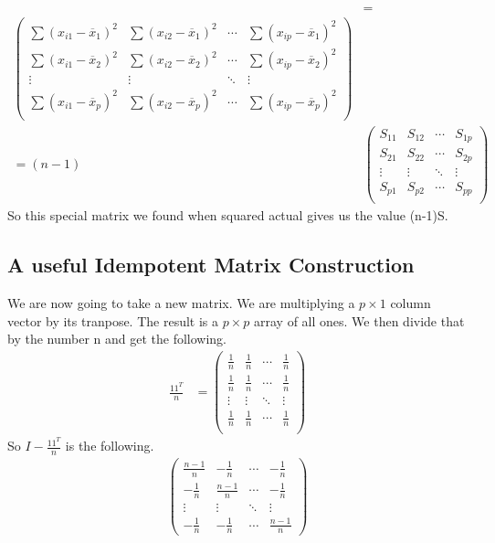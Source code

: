 \begin{align*}
    &=\\
    \begin{pmatrix}
        \displaystyle\sum(x_{i1}-\overline{x}_1)^2 & \displaystyle\sum(x_{i2}-\overline{x}_1)^2 & \cdots & \displaystyle\sum(x_{ip}-\overline{x}_1)^2 \\
        \displaystyle\sum(x_{i1}-\overline{x}_2)^2 & \displaystyle\sum(x_{i2}-\overline{x}_2)^2 & \cdots & \displaystyle\sum(x_{ip}-\overline{x}_2)^2 \\
        \vdots & \vdots & \ddots & \vdots \\
        \displaystyle\sum(x_{i1}-\overline{x}_p)^2 & \displaystyle\sum(x_{i2}-\overline{x}_p)^2 & \cdots & \displaystyle\sum(x_{ip}-\overline{x}_p)^2 \\
    \end{pmatrix}\\
    = (n-1)&
    \begin{pmatrix}
        S_{11} & S_{12} & \cdots & S_{1p}\\
        S_{21} & S_{22} & \cdots & S_{2p}\\
        \vdots & \vdots & \ddots & \vdots \\
        S_{p1} & S_{p2} & \cdots & S_{pp}\\
    \end{pmatrix}
\end{align*}
So this special matrix we found when squared actual gives us the value (n-1)S.

\subsection{A useful Idempotent Matrix Construction}
We are now going to take a new matrix. We are multiplying a $p \times 1$ column vector by its tranpose. The result is a $p\times p$ array of all ones. We then divide that by the number n and get the following.
\begin{align*}
    \frac{11^T}{n} &= \begin{pmatrix}
        \frac{1}{n} & \frac{1}{n} & \cdots & \frac{1}{n} \\
        \frac{1}{n} & \frac{1}{n} & \cdots & \frac{1}{n} \\
        \vdots & \vdots & \ddots & \vdots \\
        \frac{1}{n} & \frac{1}{n} & \cdots & \frac{1}{n} \\
    \end{pmatrix}
\end{align*}
So $I-\frac{11^T}{n}$ is the following.
\begin{align*}
    \begin{pmatrix}
        \frac{n-1}{n} & -\frac{1}{n} & \cdots & -\frac{1}{n}\\
        -\frac{1}{n} & \frac{n-1}{n} & \cdots & -\frac{1}{n}\\
        \vdots & \vdots & \ddots & \vdots \\ 
        -\frac{1}{n} & -\frac{1}{n} & \cdots & \frac{n-1}{n}
    \end{pmatrix}
\end{align*}

